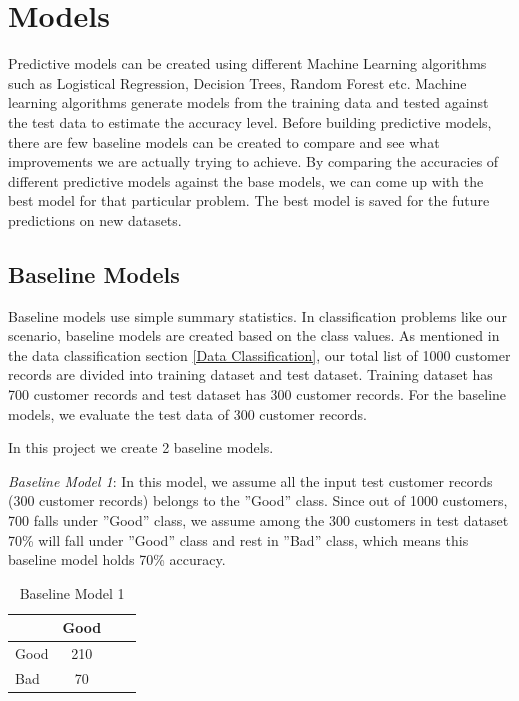 \documentclass[sigconf]{acmart}
\begin{document}
\section{Models}

Predictive models can be created using different Machine Learning algorithms such as Logistical Regression, Decision Trees, Random Forest etc. Machine learning algorithms generate models from the training data and tested against the test data to estimate the accuracy level. Before building predictive models, there are few baseline models can be created to compare and see what improvements we are actually trying to achieve. By comparing the accuracies of different predictive models against the base models, we can come up with the best model for that particular problem. The best model is saved for the future predictions on new datasets.

\subsection{Baseline Models}

Baseline models use simple summary statistics. In classification problems like our scenario, baseline models are created based on the class values. As mentioned in the data classification section \ref{Data Classification}, our total list of 1000 customer records are divided into training dataset and test dataset. Training dataset has 700 customer records and test dataset has 300 customer records. For the baseline models, we evaluate the test data of 300 customer records.

In this project we create 2 baseline models. 

\textit{Baseline Model 1}: In this model, we assume all the input test customer records (300 customer records) belongs to the ''Good'' class. Since out of 1000 customers, 700 falls under ''Good'' class, we assume among the 300 customers in test dataset 70\% will fall under ''Good'' class and rest in ''Bad'' class, which means this baseline model holds 70\% accuracy. 

\begin{table}
  \caption{Baseline Model 1}
  \label{tab:table8}
  \begin{tabular}{lclc}
    \toprule
     & Good\\
    \midrule
    Good& 210\\
    Bad& 70\\
    \bottomrule
  \end{tabular}
\end{table}
\end{document}
